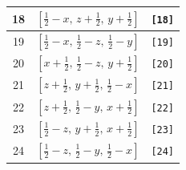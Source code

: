 \documentclass[fleqn,8pt]{jsarticle}
\begin{document}
\begin{longtable}{ccc}
18 & $\left[ \frac{1}{2} - x,\, z + \frac{1}{2},\, y + \frac{1}{2} \right]$ & {\tt [18]} \\ \hline
19 & $\left[ \frac{1}{2} - x,\, \frac{1}{2} - z,\, \frac{1}{2} - y \right]$ & {\tt [19]} \\ \hline
20 & $\left[ x + \frac{1}{2},\, \frac{1}{2} - z,\, y + \frac{1}{2} \right]$ & {\tt [20]} \\ \hline
21 & $\left[ z + \frac{1}{2},\, y + \frac{1}{2},\, \frac{1}{2} - x \right]$ & {\tt [21]} \\ \hline
22 & $\left[ z + \frac{1}{2},\, \frac{1}{2} - y,\, x + \frac{1}{2} \right]$ & {\tt [22]} \\ \hline
23 & $\left[ \frac{1}{2} - z,\, y + \frac{1}{2},\, x + \frac{1}{2} \right]$ & {\tt [23]} \\ \hline
24 & $\left[ \frac{1}{2} - z,\, \frac{1}{2} - y,\, \frac{1}{2} - x \right]$ & {\tt [24]} \\
\end{longtable}
\end{document}
